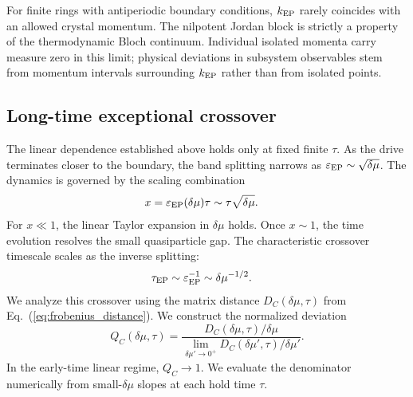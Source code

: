 \documentclass[aps,prb,reprint,superscriptaddress,amsmath,amssymb,floatfix]{revtex4-2}
\begin{document}
For finite rings with antiperiodic boundary conditions, $k_{\rm EP}$ rarely coincides with an allowed crystal momentum. The nilpotent Jordan block is strictly a property of the thermodynamic Bloch continuum. Individual isolated momenta carry measure zero in this limit; physical deviations in subsystem observables stem from momentum intervals surrounding $k_{\rm EP}$ rather than from isolated points.

\subsection{Long-time exceptional crossover}
\label{sec:longtime}

The linear dependence established above holds only at fixed finite $\tau$. As the drive terminates closer to the boundary, the band splitting narrows as $\varepsilon_{\rm EP}\sim\sqrt{\delta\mu}$. The dynamics is governed by the scaling combination
\begin{equation}
\begin{aligned}
x &= \varepsilon_{\rm EP}(\delta\mu)\tau \sim \tau\sqrt{\delta\mu}.
\end{aligned} \label{eq:double_scaling_x}
\end{equation}
For $x\ll1$, the linear Taylor expansion in $\delta\mu$ holds. Once $x\sim 1$, the time evolution resolves the small quasiparticle gap. The characteristic crossover timescale scales as the inverse splitting:
\begin{equation}
\begin{aligned}
\tau_{\rm EP} &\sim \varepsilon_{\rm EP}^{-1} \sim \delta\mu^{-1/2}.
\end{aligned} \label{eq:tau_EP}
\end{equation}
%
  We analyze this crossover using the matrix distance $D_C(\delta\mu,\tau)$ from Eq.~(\ref{eq:frobenius_distance}). We construct the normalized deviation
\begin{equation}
Q_C(\delta\mu,\tau) = \frac{D_C(\delta\mu,\tau)/\delta\mu} {\displaystyle \lim_{\delta\mu'\to0^+} D_C(\delta\mu',\tau)/\delta\mu'}.
\label{eq:QC}
\end{equation}
In the early-time linear regime, $Q_C\to1$. We evaluate the denominator numerically from small-$\delta\mu$ slopes at each hold time $\tau$.
\end{document}
